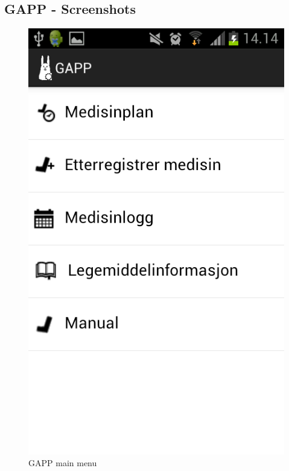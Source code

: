 

\subsection{GAPP - Screenshots}
\label{sec:gapp-screenshots}
\begin{figure}
	\begin{minipage}[b]{0.4\linewidth}
		\centering
			\includegraphics[width=0.20\paperwidth]{Pictures/Screenshots/gapp_main_menu.png}
		\caption{GAPP main menu}
		\label{fig:gapp-main-menu}
	\end{minipage}
	\hspace{3cm}
	\begin{minipage}[b]{0.4\linewidth}

\end{minipage}
\end{figure}
